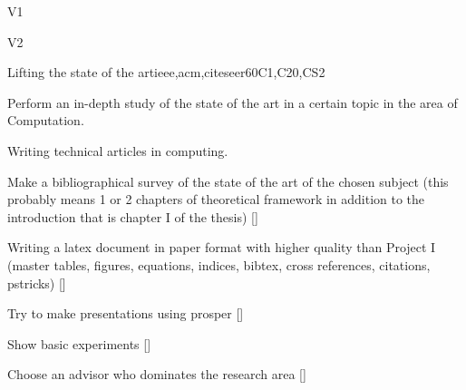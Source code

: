 \begin{syllabus}
\begin{competences}{V1}
\item {} 
\item {}
\item {}
\end{competences}

\begin{competences}{V2}
\item {} 
\item {}
\item {}
\end{competences}

\begin{unit}{Lifting the state of the art}{}{ieee,acm,citeseer}{60}{C1,C20,CS2}
  \begin{topics}
      \item Perform an in-depth study of the state of the art in a certain topic in the area of Computation.
      \item Writing technical articles in computing.
  \end{topics}
  \begin{learningoutcomes}
      \item Make a bibliographical survey of the state of the art of the chosen subject (this probably means 1 or 2 chapters of theoretical framework in addition to the introduction that is chapter I of the thesis) [\Usage]
      \item Writing a latex document in paper format with higher quality than Project I (master tables, figures, equations, indices, bibtex, cross references, citations, pstricks) [\Usage]
      \item Try to make presentations using prosper [\Usage]
      \item Show basic experiments [\Usage]
      \item Choose an advisor who dominates the research area [\Usage]
   \end{learningoutcomes}
\end{unit}

\begin{coursebibliography}
\end{coursebibliography}

\end{syllabus}
